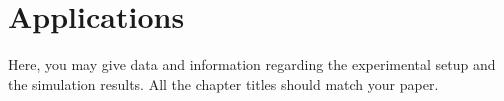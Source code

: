 \chapter{Applications}
\label{chap:app}
Here, you may give data and information regarding the experimental setup and 
the simulation results. All the chapter titles should match your paper.